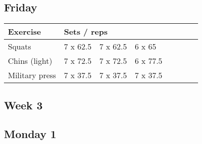 \documentclass[12pt, a4paper]{article}%
\begin{document}
  \subsection*{\hspace{0.5em} Friday }


  \begin{tabular}{l|lllllll}
  \hspace{0.75em} \textbf{Exercise} & \multicolumn{ 7 }{l}{ \textbf{Sets / reps} } \\ \hline

            \hspace{0.75em} Squats
            & 7 x 62.5
            & 7 x 62.5
            & 6 x 65
            & 
            & 
            & 
            & 
            \\


            \hspace{0.75em} Chins (light)
            & 7 x 72.5
            & 7 x 72.5
            & 6 x 77.5
            & 
            & 
            & 
            & 
            \\


            \hspace{0.75em} Military press
            & 7 x 37.5
            & 7 x 37.5
            & 7 x 37.5
            & 
            & 
            & 
            & 
            \\


  \end{tabular}


\clearpage \subsection*{\hspace{0.25em} Week 3 }
  \subsection*{\hspace{0.5em} Monday 1 }
\end{document}
